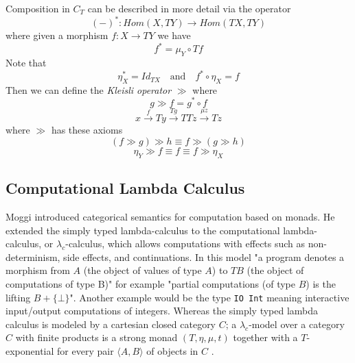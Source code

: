 Composition in $C_T$ can be described in more detail via the operator
\begin{equation}
    (-)^{*} : Hom(X, TY) \rightarrow Hom(TX, TY)
\end{equation}
where given a morphism $f: X \rightarrow TY$ we have
\begin{equation}
    f^{*} = \mu_{Y} \circ Tf
\end{equation}
Note that
\begin{equation}
    \eta_{X}^{*} = Id_{TX}
    \quad\textrm{and}\quad
    f^{*} \circ \eta _{X} = f
\end{equation}
Then we can define the \textit{Kleisli operator} $\gg$ where
\begin{equation}
    g \gg f = g^{*} \circ f
\end{equation}
\begin{equation}
    x
    \stackrel{f}{\rightarrow}     T y
    \stackrel{T g}{\rightarrow}   T T z
    \stackrel{\mu z}{\rightarrow} T z
\end{equation}
where $\gg$ has these axioms
\begin{equation}
    (f \gg g) \gg h \equiv f \gg (g \gg h)
\end{equation}
\begin{equation}
    \eta_Y \gg f \equiv f \equiv f \gg \eta_X
\end{equation}

\subsection{Computational Lambda Calculus}
Moggi \cite{moggi1989computational}
introduced categorical semantics for computation based on monads.
He extended the simply typed lambda-calculus to
the computational lambda-calculus, or $\lambda_c$-calculus,
which allows computations with effects such as
non-determinism, side effects, and continuations.
In this model "a program denotes a morphism from $A$
(the object of values of type $A$) to $TB$
(the object of computations of type B)"
for example
"partial computations (of type $B$) is the lifting $B + \{\bot\}$".
Another example would be the type \texttt{IO Int}
meaning interactive input/output computations of integers.
Whereas the simply typed lambda calculus is modeled by a cartesian closed category $C$;
a $\lambda_c$-model over a category $C$ with finite products is a strong monad $(T,\eta,\mu,t)$
together with a $T$-exponential for every pair $\langle A, B\rangle$ of objects in $C$
\cite{moggi1989computational}.

